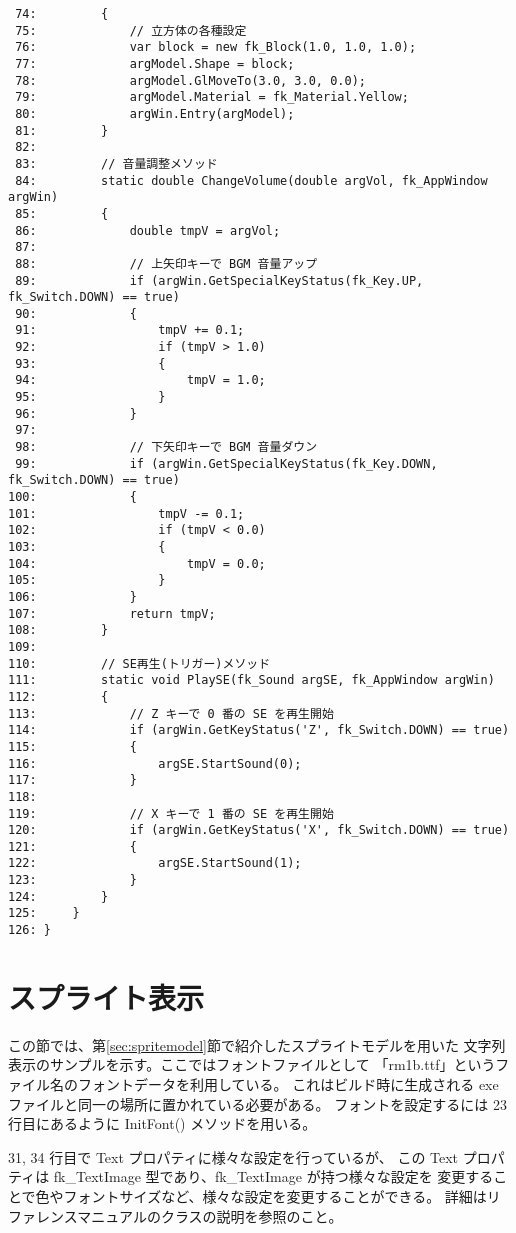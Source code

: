 \begin{breakbox}
\begin{small}
\begin{verbatim}
 74:         {
 75:             // 立方体の各種設定
 76:             var block = new fk_Block(1.0, 1.0, 1.0);
 77:             argModel.Shape = block;
 78:             argModel.GlMoveTo(3.0, 3.0, 0.0);
 79:             argModel.Material = fk_Material.Yellow;
 80:             argWin.Entry(argModel);
 81:         }
 82: 
 83:         // 音量調整メソッド
 84:         static double ChangeVolume(double argVol, fk_AppWindow argWin)
 85:         {
 86:             double tmpV = argVol;
 87: 
 88:             // 上矢印キーで BGM 音量アップ
 89:             if (argWin.GetSpecialKeyStatus(fk_Key.UP, fk_Switch.DOWN) == true)
 90:             {
 91:                 tmpV += 0.1;
 92:                 if (tmpV > 1.0)
 93:                 {
 94:                     tmpV = 1.0;
 95:                 }
 96:             }
 97: 
 98:             // 下矢印キーで BGM 音量ダウン
 99:             if (argWin.GetSpecialKeyStatus(fk_Key.DOWN, fk_Switch.DOWN) == true)
100:             {
101:                 tmpV -= 0.1;
102:                 if (tmpV < 0.0)
103:                 {
104:                     tmpV = 0.0;
105:                 }
106:             }
107:             return tmpV;
108:         }
109: 
110:         // SE再生(トリガー)メソッド
111:         static void PlaySE(fk_Sound argSE, fk_AppWindow argWin)
112:         {
113:             // Z キーで 0 番の SE を再生開始
114:             if (argWin.GetKeyStatus('Z', fk_Switch.DOWN) == true)
115:             {
116:                 argSE.StartSound(0);
117:             }
118: 
119:             // X キーで 1 番の SE を再生開始
120:             if (argWin.GetKeyStatus('X', fk_Switch.DOWN) == true)
121:             {
122:                 argSE.StartSound(1);
123:             }
124:         }
125:     }
126: }
\end{verbatim}
\end{small}
\end{breakbox}

\section{スプライト表示}
この節では、第\ref{sec:spritemodel}節で紹介したスプライトモデルを用いた
文字列表示のサンプルを示す。ここではフォントファイルとして
「rm1b.ttf」というファイル名のフォントデータを利用している。
これはビルド時に生成される exe ファイルと同一の場所に置かれている必要がある。
フォントを設定するには 23 行目にあるように InitFont() メソッドを用いる。

31, 34 行目で Text プロパティに様々な設定を行っているが、
この Text プロパティは fk\_TextImage 型であり、fk\_TextImage が持つ様々な設定を
変更することで色やフォントサイズなど、様々な設定を変更することができる。
詳細はリファレンスマニュアルのクラスの説明を参照のこと。

